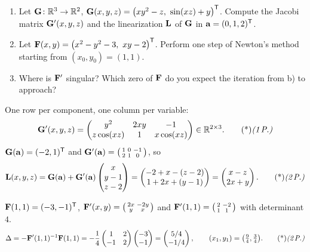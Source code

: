 \begin{enumerate}
\item Let $\mathbf{G}\colon\mathbb{R}^3\to\mathbb{R}^2$, $\vb G(x,y,z)=\big(xy^2-z,\ \sin(xz)+y\big)\T$. Compute the Jacobi matrix $\mathbf{G}'(x,y,z)$ and the linearization $\mathbf{L}$ of $\mathbf{G}$ in $\mathbf{a}=(0,1,2)^{\mathsf{T}}$.
\item Let $\vb F(x,y)=\big(x^2-y^2-3,\ xy-2\big)\T$. Perform one step of Newton's method starting from $(x_0,y_0)=(1,1)$.
\item Where is $\mathbf{F}'$ singular? Which zero of $\mathbf{F}$ do you expect the iteration from b) to approach?
\end{enumerate}

\begin{solution}
 One row per component, one column per variable:
\[
\vb G'(x,y,z)=\begin{pmatrix}y^2&2xy&-1\\z\cos(xz)&1&x\cos(xz)\end{pmatrix}\in\R^{2\times3}.\ptd{1}
\]
$\mathbf{G}(\mathbf{a})=(-2,1)^{\mathsf{T}}$ and $\mathbf{G}'(\mathbf{a})=\begin{psmallmatrix}1&0&-1\\2&1&0\end{psmallmatrix}$, so
\[
\vb L(x,y,z)=\vb G(\vb a)+\vb G'(\vb a)\begin{pmatrix}x\\y-1\\z-2\end{pmatrix}=\begin{pmatrix}-2+x-(z-2)\\1+2x+(y-1)\end{pmatrix}=\begin{pmatrix}x-z\\2x+y\end{pmatrix}.\ptd{2}
\]

 $\mathbf{F}(1,1)=(-3,-1)^{\mathsf{T}}$, $\mathbf{F}'(x,y)=\begin{psmallmatrix}2x&-2y\\y&x\end{psmallmatrix}$ and $\mathbf{F}'(1,1)=\begin{psmallmatrix}2&-2\\1&1\end{psmallmatrix}$ with determinant $4$. 
\[
\Delta=-\vb F'(1,1)^{-1}\vb F(1,1)=-\frac14\begin{pmatrix}1&2\\-1&2\end{pmatrix}\begin{pmatrix}-3\\-1\end{pmatrix}=\begin{pmatrix}5/4\\-1/4\end{pmatrix},\qquad (x_1,y_1)=\big(\tfrac94,\tfrac34\big).\ptd{2}
\]


\end{solution}
